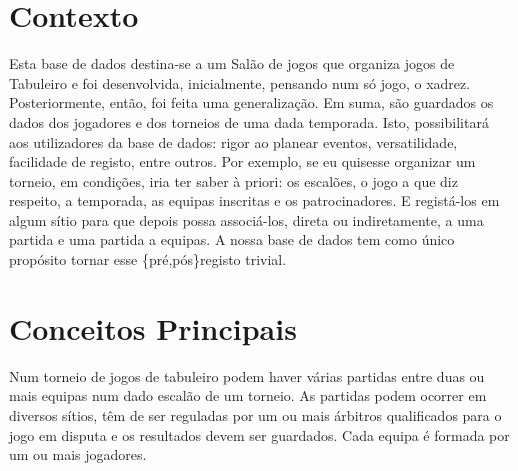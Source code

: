 \documentclass[a4paper]{article}
\begin{document}
\newpage






\section{Contexto}
Esta base de dados destina-se a um Salão de jogos que organiza jogos de Tabuleiro e foi desenvolvida, inicialmente, pensando num só jogo, o xadrez. Posteriormente, então, foi feita uma generalização. Em suma, são guardados os dados dos jogadores e dos torneios de uma dada temporada. Isto, possibilitará aos utilizadores da base de dados: rigor ao planear eventos, versatilidade, facilidade de registo, entre outros. Por exemplo, se eu quisesse organizar um torneio, em condições, iria ter saber à priori: os escalões, o jogo a que diz respeito, a temporada, as equipas inscritas e os patrocinadores. E registá-los em algum sítio para que depois possa associá-los, direta ou indiretamente, a uma partida e uma partida a equipas. A nossa base de dados tem como único propósito tornar esse \{pré,pós\}registo trivial.

\section{Conceitos Principais}
Num torneio de jogos de tabuleiro podem haver várias partidas entre duas ou mais equipas num dado escalão de um torneio. As partidas podem ocorrer em diversos sítios, têm de ser reguladas por um ou mais árbitros qualificados para o jogo em disputa e os resultados devem ser guardados. Cada equipa é formada por um ou mais jogadores.

\end{document}
